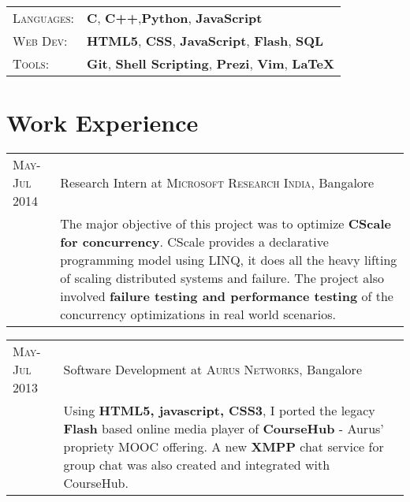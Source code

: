\documentclass[a4paper,10pt]{article} %
\begin{document}
\begin{tabular}{>{\raggedleft}p{2.2cm}p{14cm}}

    \textsc{Languages}: %
            & \textbf{C}, \textbf{C++},\textbf{Python}, \textbf{JavaScript} \\
    \textsc{Web Dev}: %
            & \textbf{HTML5}, \textbf{CSS}, \textbf{JavaScript}, \textbf{Flash}, \textbf{SQL}\\
    \textsc{Tools}: %
            & \textbf{Git}, \textbf{Shell Scripting}, \textbf{Prezi}, \textbf{Vim}, \textbf{LaTeX}\\

\end{tabular}


\section{Work Experience}

\begin{tabular}{p{2.2cm}|p{14cm}}
    \textsc{May-Jul 2014} & Research Intern at \textsc{Microsoft Research India}, Bangalore\emph{}\\
                          & \footnotesize{The major objective of this project was to optimize
                            \textbf{CScale for concurrency}. CScale provides a declarative programming model
                            using LINQ, it does all the heavy lifting of scaling distributed systems and
                            failure. The project also involved \textbf{failure testing and performance testing}
                            of the concurrency optimizations in real world scenarios.}\\
\end{tabular}

\begin{tabular}{p{2.2cm}|p{14cm}}
    \textsc{May-Jul 2013} & Software Development at \textsc{Aurus Networks}, Bangalore\emph{}\\
                          & \footnotesize{Using \textbf{HTML5, javascript, CSS3}, I ported the legacy
                            \textbf{Flash} based online media player of \textbf{CourseHub} - Aurus'
                            propriety MOOC offering. A new \textbf{XMPP} chat service for group chat
                            was also created and integrated with CourseHub.}\\
\end{tabular}
\end{document}
